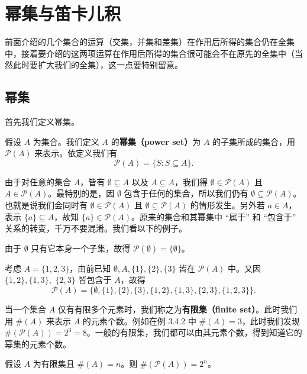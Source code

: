 \section{幂集与笛卡儿积}

前面介绍的几个集合的运算（交集，并集和差集）在作用后所得的集合仍在全集中，接着要介绍的这两项运算在作用后所得的集合很可能会不在原先的全集中（当然此时要扩大我们的全集），这一点要特别留意。

\subsection{幂集}

首先我们定义幂集。

\begin{definition}
假设 $A$ 为集合。我们定义 $A$ 的{\bf 幂集（power set）}为 $A$ 的子集所成的集合，用 $\mathcal{P}(A)$ 来表示。依定义我们有
$$ \mathcal{P}(A) = \{S : S \subseteq A\}. $$
\end{definition}

由于对任意的集合 $A$，皆有 $\emptyset \subseteq A$ 以及 $A \subseteq A$，我们得 $\emptyset \in \mathcal{P}(A)$ 且 $A \in \mathcal{P}(A)$。最特别的是，因 $\emptyset$ 包含于任何的集合，所以我们仍有 $\emptyset \subseteq \mathcal{P}(A)$。也就是说我们会同时有 $\emptyset \in \mathcal{P}(A)$ 且 $\emptyset \subseteq \mathcal{P}(A)$ 的情形发生。另外若 $a \in A$，表示 $\{a\} \subseteq A$，故知 $\{a\} \in \mathcal{P}(A)$。原来的集合和其幂集中 “属于” 和 “包含于” 关系的转变，千万不要混淆。我们看以下的例子。

\begin{example}
由于 $\emptyset$ 只有它本身一个子集，故得 $\mathcal{P}(\emptyset) = \{\emptyset\}$。

考虑 $A = \{1, 2, 3\}$，由前已知 $\emptyset, A, \{1\}, \{2\}, \{3\}$ 皆在 $\mathcal{P}(A)$ 中。又因 $\{1, 2\}, \{1, 3\},$ $ \{2, 3\}$ 皆包含于 $A$，故得
$$ \mathcal{P}(A) = \{\emptyset, \{1\}, \{2\}, \{3\}, \{1, 2\}, \{1, 3\}, \{2, 3\}, \{1, 2, 3\}\}. $$
\end{example}

当一个集合 $A$ 仅有有限多个元素时，我们称之为\textbf{有限集（finite set）}。此时我们用 $\#(A)$ 来表示 $A$ 的元素个数。例如在例 3.4.2 中 $\#(A) = 3$，此时我们发现 $\#(\mathcal{P}(A)) = 2^3 = 8$。一般的有限集，我们都可以由其元素个数，得到知道它的幂集的元素个数。

\begin{proposition}
假设 $A$ 为有限集且 $\#(A) = n$。则 $\#(\mathcal{P}(A)) = 2^n$。
\end{proposition}

